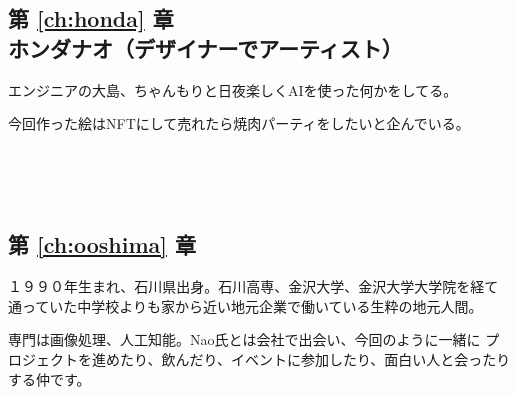 \documentclass[dvipdfmx,autodetect-engine,10pt,b5paper,papersize,openany,dvipsnames]{jsbook}
\begin{document}
{\subsection*{第 \ref{ch:honda} 章\\ ホンダナオ（デザイナーでアーティスト）}

エンジニアの大島、ちゃんもりと日夜楽しくAIを使った何かをしてる。

今回作った絵はNFTにして売れたら焼肉パーティをしたいと企んでいる。




\subsection*{第 \ref{ch:ooshima} 章\\ }

１９９０年生まれ、石川県出身。石川高専、金沢大学、金沢大学大学院を経て
通っていた中学校よりも家から近い地元企業で働いている生粋の地元人間。

専門は画像処理、人工知能。Nao氏とは会社で出会い、今回のように一緒に
プロジェクトを進めたり、飲んだり、イベントに参加したり、面白い人と会ったり
する仲です。
}

\newpage
\end{document}
